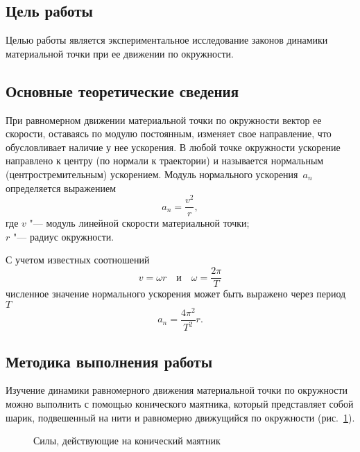 \documentclass[a4paper, 12pt]{extarticle}
\begin{document}
\MTDTitlePage
\MTDInfoPage

\setcounter{section}{7}

\subsection{Цель работы}
Целью работы является экспериментальное исследование законов динамики  материальной точки при ее движении по окружности. 

\subsection{Основные теоретические сведения}
При равномерном движении материальной точки по окружности вектор ее скорости, оставаясь по модулю постоянным, изменяет свое направление,  что обусловливает наличие у нее ускорения. В любой точке окружности ускорение направлено к центру (по нормали к траектории) и называется нормальным (центростремительным) ускорением. Модуль нормального ускорения~$a_n$ определяется выражением 
\begin{equation}
\label{eq:m7-radial-acc-1}
a_n = \frac{v^2}{r},
\end{equation}
где $v$ "--- модуль линейной скорости материальной точки; \\
$r$ "--- радиус окружности.

С учетом известных соотношений
\begin{equation}
\label{eq:m7-angular-velocity}
v = \omega r \quad \text{и} \quad \omega = \frac{2\pi}{T} %
\end{equation}
численное значение нормального ускорения может быть выражено через период~$T$
\begin{equation}
\label{eq:m7-radial-acc-2}
a_n = \frac{4\pi^2}{T^2}r.
\end{equation}

\subsection{Методика выполнения работы}
Изучение динамики равномерного движения материальной точки по окружности можно выполнить с помощью конического маятника, который представляет собой шарик, подвешенный на нити и равномерно движущийся по окружности (рис.~\ref{fig:m7-conical-pendulum}).

\begin{figure}[h] %
\begin{center}
\end{center}
\caption{Силы, действующие на конический маятник \label{fig:m7-conical-pendulum}}
\end{figure}
\end{document}

